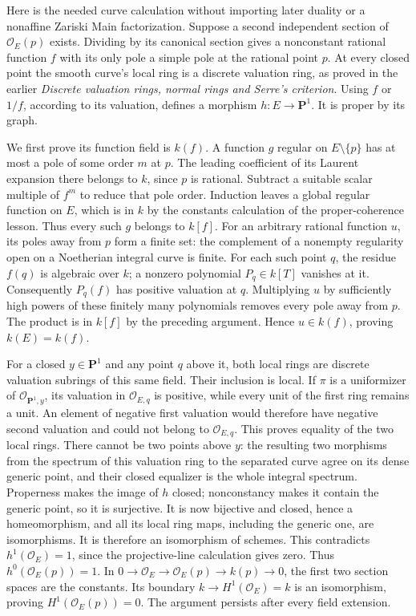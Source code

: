 \documentclass[11pt]{article}
\begin{document}
Here is the needed curve calculation without importing later duality or
a nonaffine Zariski Main factorization. Suppose a second independent
section of \(\mathcal O_E(p)\) exists. Dividing by its canonical section
gives a nonconstant rational function \(f\) with its only pole a simple
pole at the rational point \(p\). At every closed point the smooth
curve's local ring is a discrete valuation ring, as proved in the
earlier \emph{Discrete valuation rings, normal rings and Serre's
criterion}. Using \(f\) or \(1/f\), according to its valuation, defines
a morphism \(h:E\to\mathbf P^1\). It is proper by its graph.

We first prove its function field is \(k(f)\). A function \(g\) regular
on \(E\setminus\{p\}\) has at most a pole of some order \(m\) at \(p\).
The leading coefficient of its Laurent expansion there belongs to \(k\),
since \(p\) is rational. Subtract a suitable scalar multiple of \(f^m\)
to reduce that pole order. Induction leaves a global regular function on
\(E\), which is in \(k\) by the constants calculation of the
proper-coherence lesson. Thus every such \(g\) belongs to \(k[f]\). For
an arbitrary rational function \(u\), its poles away from \(p\) form a
finite set: the complement of a nonempty regularity open on a Noetherian
integral curve is finite. For each such point \(q\), the residue
\(f(q)\) is algebraic over \(k\); a nonzero polynomial \(P_q\in k[T]\)
vanishes at it. Consequently \(P_q(f)\) has positive valuation at \(q\).
Multiplying \(u\) by sufficiently high powers of these finitely many
polynomials removes every pole away from \(p\). The product is in
\(k[f]\) by the preceding argument. Hence \(u\in k(f)\), proving
\(k(E)=k(f)\).

For a closed \(y\in\mathbf P^1\) and any point \(q\) above it, both
local rings are discrete valuation subrings of this same field. Their
inclusion is local. If \(\pi\) is a uniformizer of
\(\mathcal O_{\mathbf P^1,y}\), its valuation in \(\mathcal O_{E,q}\) is
positive, while every unit of the first ring remains a unit. An element
of negative first valuation would therefore have negative second
valuation and could not belong to \(\mathcal O_{E,q}\). This proves
equality of the two local rings. There cannot be two points above \(y\):
the resulting two morphisms from the spectrum of this valuation ring to
the separated curve agree on its dense generic point, and their closed
equalizer is the whole integral spectrum. Properness makes the image of
\(h\) closed; nonconstancy makes it contain the generic point, so it is
surjective. It is now bijective and closed, hence a homeomorphism, and
all its local ring maps, including the generic one, are isomorphisms. It
is therefore an isomorphism of schemes. This contradicts
\(h^1(\mathcal O_E)=1\), since the projective-line calculation gives
zero. Thus \(h^0(\mathcal O_E(p))=1\). In
\(0\to\mathcal O_E\to\mathcal O_E(p)\to k(p)\to0\), the first two
section spaces are the constants. Its boundary
\(k\to H^1(\mathcal O_E)=k\) is an isomorphism, proving
\(H^1(\mathcal O_E(p))=0\). The argument persists after every field
extension.
\end{document}
